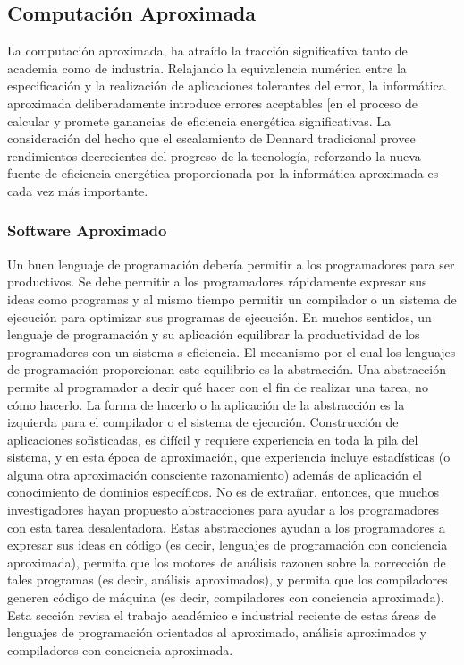 \subsection*{Computación Aproximada}

La computación aproximada, ha atraído la tracción significativa tanto de academia como de industria. Relajando la equivalencia numérica entre la especificación y la realización de aplicaciones tolerantes del error, la informática aproximada deliberadamente introduce errores aceptables [en el proceso de calcular y promete ganancias de eficiencia energética significativas. La consideración del hecho que el escalamiento de Dennard tradicional provee rendimientos decrecientes del progreso de la tecnología, reforzando la nueva fuente de eficiencia energética proporcionada por la informática aproximada es cada vez más importante\cite{Xu2016}.

\subsubsection*{Software Aproximado}

Un buen lenguaje de programación debería permitir a los programadores para ser productivos. Se debe permitir a los programadores rápidamente expresar sus ideas como programas y al mismo tiempo permitir un compilador o un sistema de ejecución para optimizar sus programas de ejecución. En muchos sentidos, un lenguaje de programación y su aplicación equilibrar la productividad de los programadores con un sistema s eficiencia. El mecanismo por el cual los lenguajes de programación proporcionan este equilibrio es la abstracción. Una abstracción permite al programador a decir qué hacer con el fin de realizar una tarea, no cómo hacerlo. La forma de hacerlo o la aplicación de la abstracción es la izquierda para el compilador o el sistema de ejecución. Construcción de aplicaciones sofisticadas, es difícil y requiere experiencia en toda la pila del sistema, y en esta época de aproximación, que experiencia incluye estadísticas (o alguna otra aproximación consciente razonamiento) además de aplicación el conocimiento de dominios específicos. No es de extrañar, entonces, que muchos investigadores hayan propuesto abstracciones para ayudar a los programadores con esta tarea desalentadora. Estas abstracciones ayudan a los programadores a expresar sus ideas en código (es decir, lenguajes de programación con conciencia aproximada), permita que los motores de análisis razonen sobre la corrección de tales programas (es decir, análisis aproximados), y permita que los compiladores generen código de máquina (es decir, compiladores con conciencia aproximada). Esta sección revisa el trabajo académico e industrial reciente de estas áreas de lenguajes de programación orientados al aproximado, análisis aproximados y compiladores con conciencia aproximada\cite{Xu2016}.


